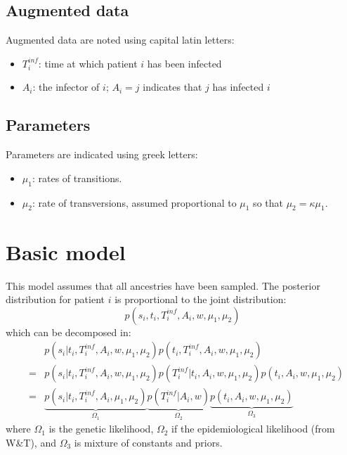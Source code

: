 \documentclass[10pt]{article}
\begin{document}
\subsection*{Augmented data}
Augmented data are noted using capital latin letters:
\begin{itemize}
	\item $T_i^{inf}$: time at which patient $i$ has been infected
	\item $A_i$: the infector of $i$; $A_i=j$ indicates that $j$ has infected $i$
\end{itemize}



\subsection*{Parameters}
Parameters are indicated using greek letters:
\begin{itemize}
	\item $\mu_1$: rates of transitions.
	\item $\mu_2 $: rate of transversions, assumed proportional to $\mu_1$ so that $\mu_2 = \kappa \mu_1$.
\end{itemize}






\section*{Basic model}
This model assumes that all ancestries have been sampled.
The posterior distribution for patient $i$ is proportional to the joint distribution:
\begin{equation}
 p(s_i, t_i, T_i^{inf}, A_i, w, \mu_1, \mu_2)
\end{equation}
which can be decomposed in:
\begin{eqnarray}
& & p(s_i | t_i, T_i^{inf}, A_i, w, \mu_1, \mu_2)  p(t_i, T_i^{inf}, A_i, w, \mu_1, \mu_2)\\
&=& p(s_i | t_i, T_i^{inf}, A_i, w, \mu_1, \mu_2)  p(T_i^{inf} | t_i, A_i, w, \mu_1, \mu_2) p(t_i, A_i, w, \mu_1, \mu_2)\\
&=& \underbrace{p(s_i | t_i, T_i^{inf}, A_i, \mu_1, \mu_2)}_{\Omega_1}  
    \underbrace{p(T_i^{inf} | A_i, w)}_{\Omega_2}
    \underbrace{p(t_i, A_i, w, \mu_1, \mu_2)}_{\Omega_3} 
\end{eqnarray}
\noindent where $\Omega_1$ is the genetic likelihood, $\Omega_2$ if the epidemiological likelihood (from W\&T), and $\Omega_3$ is mixture of constants and priors.
\\
\end{document}
